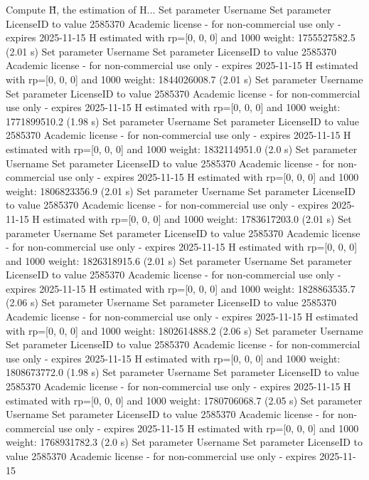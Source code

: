 Compute H̃, the estimation of H...
Set parameter Username
Set parameter LicenseID to value 2585370
Academic license - for non-commercial use only - expires 2025-11-15
  H estimated with rp=[0, 0, 0] and 1000 weight:  1755527582.5  (2.01 s)
Set parameter Username
Set parameter LicenseID to value 2585370
Academic license - for non-commercial use only - expires 2025-11-15
  H estimated with rp=[0, 0, 0] and 1000 weight:  1844026008.7  (2.01 s)
Set parameter Username
Set parameter LicenseID to value 2585370
Academic license - for non-commercial use only - expires 2025-11-15
  H estimated with rp=[0, 0, 0] and 1000 weight:  1771899510.2  (1.98 s)
Set parameter Username
Set parameter LicenseID to value 2585370
Academic license - for non-commercial use only - expires 2025-11-15
  H estimated with rp=[0, 0, 0] and 1000 weight:  1832114951.0  (2.0 s)
Set parameter Username
Set parameter LicenseID to value 2585370
Academic license - for non-commercial use only - expires 2025-11-15
  H estimated with rp=[0, 0, 0] and 1000 weight:  1806823356.9  (2.01 s)
Set parameter Username
Set parameter LicenseID to value 2585370
Academic license - for non-commercial use only - expires 2025-11-15
  H estimated with rp=[0, 0, 0] and 1000 weight:  1783617203.0  (2.01 s)
Set parameter Username
Set parameter LicenseID to value 2585370
Academic license - for non-commercial use only - expires 2025-11-15
  H estimated with rp=[0, 0, 0] and 1000 weight:  1826318915.6  (2.01 s)
Set parameter Username
Set parameter LicenseID to value 2585370
Academic license - for non-commercial use only - expires 2025-11-15
  H estimated with rp=[0, 0, 0] and 1000 weight:  1828863535.7  (2.06 s)
Set parameter Username
Set parameter LicenseID to value 2585370
Academic license - for non-commercial use only - expires 2025-11-15
  H estimated with rp=[0, 0, 0] and 1000 weight:  1802614888.2  (2.06 s)
Set parameter Username
Set parameter LicenseID to value 2585370
Academic license - for non-commercial use only - expires 2025-11-15
  H estimated with rp=[0, 0, 0] and 1000 weight:  1808673772.0  (1.98 s)
Set parameter Username
Set parameter LicenseID to value 2585370
Academic license - for non-commercial use only - expires 2025-11-15
  H estimated with rp=[0, 0, 0] and 1000 weight:  1780706068.7  (2.05 s)
Set parameter Username
Set parameter LicenseID to value 2585370
Academic license - for non-commercial use only - expires 2025-11-15
  H estimated with rp=[0, 0, 0] and 1000 weight:  1768931782.3  (2.0 s)
Set parameter Username
Set parameter LicenseID to value 2585370
Academic license - for non-commercial use only - expires 2025-11-15
